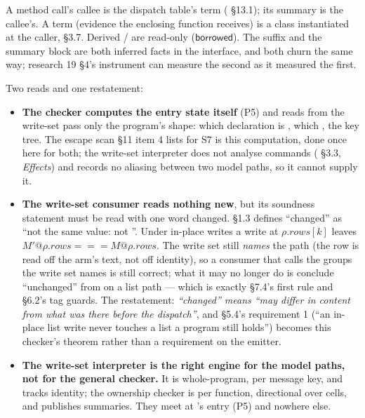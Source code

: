 A method call's callee is the dispatch table's term ( §13.1); its summary is the callee's. A  term (evidence the enclosing function receives) is a class instantiated at the caller, §3.7. Derived / are read-only ($\mathsf{borrowed}$). The  suffix and the summary block are both inferred facts in the interface, and both churn the same way; research 19 §4's instrument can measure the second as it measured the first.


Two reads and one restatement:

\begin{itemize}
\item \textbf{The checker computes the entry state itself} (P5) and reads from the write-set pass only the program's shape: which declaration is , which , the key tree. The escape scan  §11 item 4 lists for S7 is this computation, done once here for both; the write-set interpreter does not analyse commands ( §3.3, \emph{Effects}) and records no aliasing between two model paths, so it cannot supply it.
\item \textbf{The write-set consumer reads nothing new}, but its soundness statement must be read with one word changed.  §1.3 defines “changed” as “not the same value: not \code{===}”. Under in-place writes a  write at $\rho .\mathit{rows}[k]$ leaves $M'@\rho .\mathit{rows}\mathrel{\mathtt{===}}M@\rho .\mathit{rows}$. The write set still \emph{names} the path (the  row is read off the arm's text, not off identity), so a consumer that calls the groups the write set names is still correct; what it may no longer do is conclude “unchanged” from \code{===} on a list path — which is exactly  §7.4's first rule and §6.2's tag guards. The restatement: \emph{“changed” means “may differ in content from what was there before the dispatch”}, and  §5.4's requirement 1 (“an in-place list write never touches a list a program still holds”) becomes this checker's theorem rather than a requirement on the emitter.
\item \textbf{The write-set interpreter is the right engine for the model paths, not for the general checker.} It is whole-program, per message key, and tracks identity; the ownership checker is per function, directional over cells, and publishes summaries. They meet at 's entry (P5) and nowhere else.
\end{itemize}

